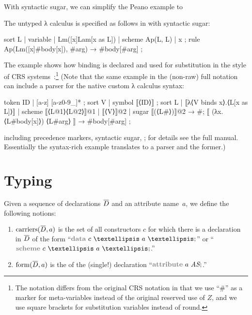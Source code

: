 \documentclass[letterpaper,11pt]{article}
\begin{document}
\begin{example}
  With syntactic sugar, we can simplify the Peano example to
\end{example}

\begin{example}
  The untyped λ calculus is specified as follows in \hax with syntactic sugar:
  \begin{hacs}
    sort L | variable | Lm([x]Lam[x as L]) | scheme Ap(L, L) | x ;
    rule Ap(Lm([x]#body[x]), #arg) →  #body[#arg] ;
  \end{hacs}
  The example shows how binding is declared and used for substitution in the style of CRS
  systems~\cite{Klop+:tcs1993}:\footnote{The notation differs from the original CRS notation in that
    we use ``\#'' as a marker for meta-variables instead of the original reserved use of $Z$, and we
    use square brackets for substitution variables instead of round.}
  (Note that the same example in the (non-raw) full \HAX notation can include a parser for the
  native custom λ calculus syntax:
  \begin{hacs}
    token ID | [a-z] [a-z0-9_]* ;
    sort V | symbol ⟦⟨ID⟩⟧ ;
    sort L | ⟦λ⟨V binds x⟩.⟨L[x as L]⟩⟧ | scheme ⟦⟨L@1⟩⟨L@2⟩⟧@1
           | ⟦⟨V⟩⟧@2 | sugar ⟦(⟨L#⟩)⟧@2 →  #;
    ⟦ (λx.⟨L#body[x]⟩) ⟨L#arg⟩ ⟧ →  #body[#arg] ;
  \end{hacs}
  including precedence markers, syntactic sugar, \etc; for details see the full \HAX
  manual. Essentially the syntax-rich example translates to a parser and the former.)
\end{example}


\section{\HAX Typing}
\label{sec:typing}


\begin{definition}
  Given a sequence of declarations $\ov{D}$ and an attribute name~$a$, we define the following
  notions:
  \begin{enumerate}

  \item $\op{carriers}(\ov{D}, a)$ is the set of all constructors $c$ for which there is a
    declaration in $\ov{D}$ of the form ``$\kw{data}~c~…~a~…\kw;$'' or
    ``$\kw{scheme}~c~…~a~…\kw;$.''

  \item $\op{form}(\ov{D}, a)$ is the  of the (single!) declaration
    ``$\kw{attribute}~a~\set{AS}\kw;$.''

  \end{enumerate}
  
\end{definition}
\end{document}
